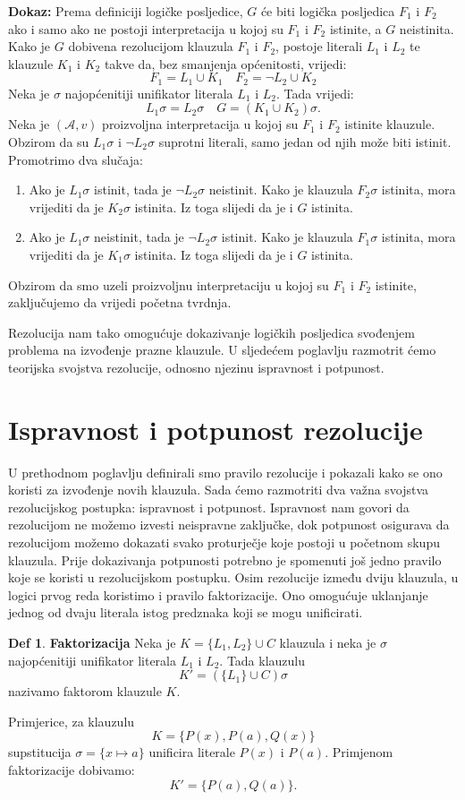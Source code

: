 \documentclass{article}
\theoremstyle{definition}
\newtheorem{definicija}{Def}[section]
\theoremstyle{plain}
\begin{document}
\textbf{Dokaz:}\newline
Prema definiciji logičke posljedice, $G$ će biti logička posljedica $F_1$ i $F_2$ ako i samo ako ne postoji interpretacija u kojoj su $F_1$ i $F_2$ istinite, a $G$ neistinita. Kako je $G$ dobivena rezolucijom klauzula $F_1$ i $F_2$, postoje literali $L_1$ i $L_2$ te klauzule $K_1$ i $K_2$ takve da, bez smanjenja općenitosti, vrijedi:
\[
F_1 = {L_1}\cup K_1 \quad
F_2 = {\neg L_2}\cup K_2
\]
Neka je $\sigma$ najopćenitiji unifikator literala $L_1$ i $L_2$. Tada vrijedi:
\[
L_1\sigma=L_2\sigma \quad
G=(K_1\cup K_2)\sigma.
\]
Neka je $(\mathcal A,v)$ proizvoljna interpretacija u kojoj su $F_1$ i $F_2$ istinite klauzule. Obzirom da su $L_1\sigma$ i $\neg L_2\sigma$ suprotni literali, samo jedan od njih može biti istinit. Promotrimo dva slučaja:

\begin{enumerate}
\item Ako je $L_1\sigma$ istinit, tada je $\neg L_2\sigma$ neistinit. Kako je klauzula $F_2\sigma$ istinita, mora vrijediti da je $K_2\sigma$ istinita. Iz toga slijedi da je i $G$ istinita.
\item Ako je $L_1\sigma$ neistinit, tada je $\neg L_2\sigma$ istinit. Kako je klauzula $F_1\sigma$ istinita, mora vrijediti da je $K_1\sigma$ istinita. Iz toga slijedi da je i $G$ istinita.
\end{enumerate}

Obzirom da smo uzeli proizvoljnu interpretaciju u kojoj su $F_1$ i $F_2$ istinite, zaključujemo da vrijedi početna tvrdnja.

Rezolucija nam tako omogućuje dokazivanje logičkih posljedica svođenjem problema na izvođenje prazne klauzule. U sljedećem poglavlju razmotrit ćemo teorijska svojstva rezolucije, odnosno njezinu ispravnost i potpunost.

\section{Ispravnost i potpunost rezolucije}
U prethodnom poglavlju definirali smo pravilo rezolucije i pokazali kako se ono koristi za izvođenje novih klauzula. Sada ćemo razmotriti dva važna svojstva rezolucijskog postupka: ispravnost i potpunost. Ispravnost nam govori da rezolucijom ne možemo izvesti neispravne zaključke, dok potpunost osigurava da rezolucijom možemo dokazati svako proturječje koje postoji u početnom skupu klauzula. Prije dokazivanja potpunosti potrebno je spomenuti još jedno pravilo koje se koristi u rezolucijskom postupku. Osim rezolucije između dviju klauzula, u logici prvog reda koristimo i pravilo faktorizacije. Ono omogućuje uklanjanje jednog od dvaju literala istog predznaka koji se mogu unificirati.
\begin{definicija}\textbf{Faktorizacija}\newline
Neka je $K=\{L_1,L_2\}\cup C$ klauzula i neka je $\sigma$ najopćenitiji unifikator literala $L_1$ i $L_2$. Tada klauzulu
\[
K'=(\{L_1\}\cup C)\sigma
\]
nazivamo faktorom klauzule $K$.
\end{definicija}
Primjerice, za klauzulu
\[
K=\{P(x),P(a),Q(x)\}
\]
supstitucija $\sigma=\{x\mapsto a\}$ unificira literale $P(x)$ i $P(a)$. Primjenom faktorizacije dobivamo:
\[
K'=\{P(a),Q(a)\}.
\]
\end{document}
